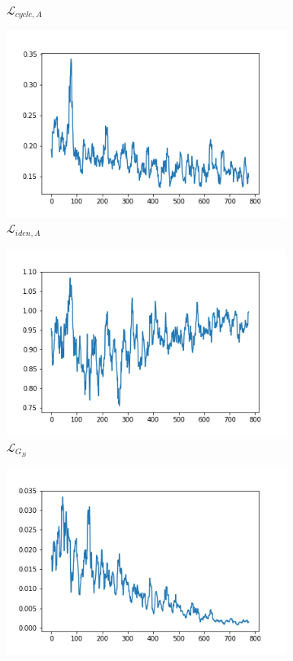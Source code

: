\documentclass{beamer}
\begin{document}
\begin{frame}
\begin{figure}[htb]
\begin{subfigure}[b]{0.23\linewidth}
        \caption{$\mathcal{L}_{cycle,A}$}
      \end{subfigure}
      \begin{subfigure}[b]{0.23\linewidth}
        \includegraphics[width=\linewidth]{exp3_idt_A.png}
        \caption{$\mathcal{L}_{iden,A}$}
      \end{subfigure}
      \begin{subfigure}[b]{0.23\linewidth}
        \includegraphics[width=\linewidth]{exp3_G_B.png}
        \caption{$\mathcal{L}_{G_B}$}
      \end{subfigure}
      \begin{subfigure}[b]{0.23\linewidth}
        \includegraphics[width=\linewidth]{exp3_D_B.png}

\end{subfigure}
\end{figure}
\end{frame}
\end{document}
